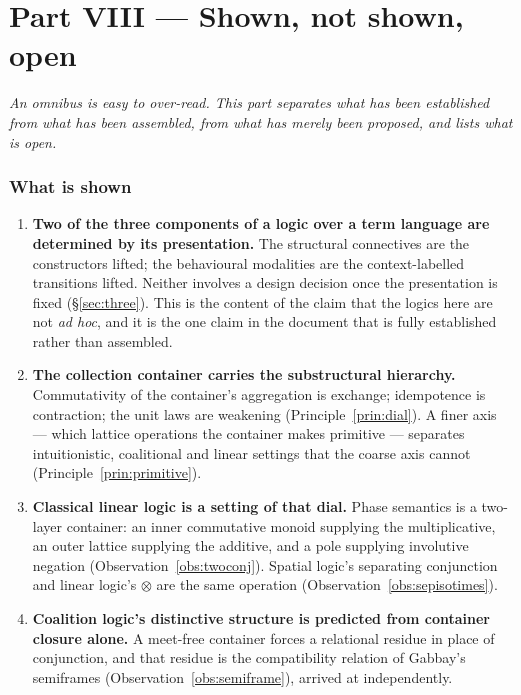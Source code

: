 \part*{Part VIII --- Shown, not shown, open}

\bigskip
\noindent
\emph{An omnibus is easy to over-read. This part separates what has been
established from what has been assembled, from what has merely been proposed, and
lists what is open.}
\bigskip

\section{What is shown}
\label{sec:shown}

\begin{enumerate}[leftmargin=2em]
\item \textbf{Two of the three components of a logic over a term language are
determined by its presentation.} The structural connectives are the constructors
lifted; the behavioural modalities are the context-labelled transitions lifted.
Neither involves a design decision once the presentation is fixed
(\S\ref{sec:three}). This is the content of the claim that the logics here are not
\emph{ad hoc}, and it is the one claim in the document that is fully established
rather than assembled.

\item \textbf{The collection container carries the substructural hierarchy.}
Commutativity of the container's aggregation is exchange; idempotence is
contraction; the unit laws are weakening (Principle~\ref{prin:dial}). A finer axis
--- which lattice operations the container makes primitive --- separates
intuitionistic, coalitional and linear settings that the coarse axis cannot
(Principle~\ref{prin:primitive}).

\item \textbf{Classical linear logic is a setting of that dial.} Phase semantics
is a two-layer container: an inner commutative monoid supplying the multiplicative,
an outer lattice supplying the additive, and a pole supplying involutive negation
(Observation~\ref{obs:twoconj}). Spatial logic's separating conjunction and linear
logic's $\otimes$ are the same operation (Observation~\ref{obs:sepisotimes}).

\item \textbf{Coalition logic's distinctive structure is predicted from container
closure alone.} A meet-free container forces a relational residue in place of
conjunction, and that residue is the compatibility relation of Gabbay's semiframes
(Observation~\ref{obs:semiframe}), arrived at independently.


\end{enumerate}
